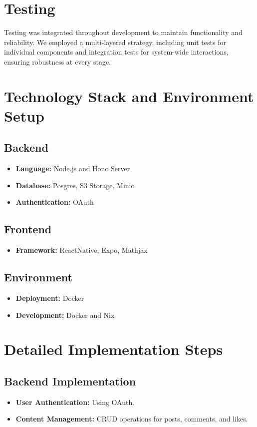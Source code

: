 \section{Testing}
\label{sec:testing}

Testing was integrated throughout development to maintain functionality and reliability. We employed a multi-layered strategy, including unit tests for individual components and integration tests for system-wide interactions, ensuring robustness at every stage.

\section{Technology Stack and Environment Setup}
\subsection{Backend}
\begin{itemize}
    \item \textbf{Language:} Node.js and Hono Server
    \item \textbf{Database:} Posgres, S3 Storage, Minio
    \item \textbf{Authentication:} OAuth
\end{itemize}

\subsection{Frontend}
\begin{itemize}
    \item \textbf{Framework:} ReactNative, Expo, Mathjax
\end{itemize}

\subsection{Environment}
\begin{itemize}
    \item \textbf{Deployment:} Docker
    \item \textbf{Development:} Docker and Nix
\end{itemize}

\section{Detailed Implementation Steps}
\subsection{Backend Implementation}
\begin{itemize}
    \item \textbf{User Authentication:} Using OAuth.
    \item \textbf{Content Management:} CRUD operations for posts, comments, and likes.
\end{itemize}

